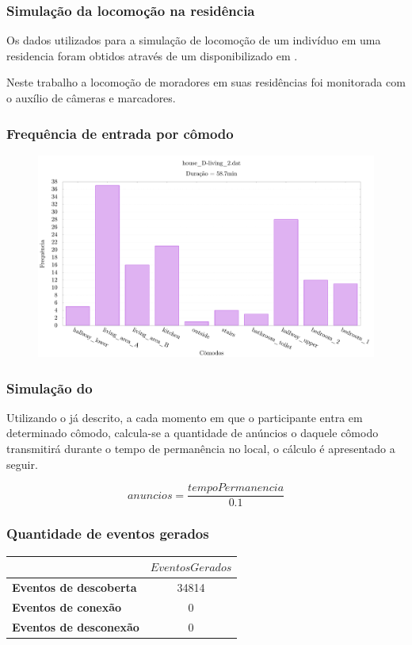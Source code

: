 \documentclass[aspectratio=169]{beamer}
\begin{document}
\begin{frame}
	\frametitle{Simulação da locomoção na residência}
	Os dados utilizados para a simulação de locomoção de um indivíduo em uma residencia foram obtidos através de um \dataset disponibilizado em \cite{byrne:et-al:2018}.

	\bigskip

	Neste trabalho a locomoção de moradores em suas residências foi monitorada com o auxílio de câmeras e marcadores.
\end{frame}

\begin{frame}
	\frametitle{Frequência de entrada por cômodo}
	\begin{figure}
		\centering
		\includegraphics[width=.80\linewidth]{img/dataset-histogram.pdf}
	\end{figure}
\end{frame}

\begin{frame}
	\frametitle{Simulação do \beacons}
	Utilizando o \dataset já descrito, a cada momento em que o participante entra em determinado cômodo, calcula-se a quantidade de anúncios o \beacon daquele cômodo transmitirá durante o tempo de permanência no local, o cálculo é apresentado a seguir.
	
	\begin{equation}
		anuncios = \frac{tempoPermanencia}{0.1} 
	\end{equation}
\end{frame}

\begin{frame}
	\frametitle{Quantidade de eventos gerados}
	\begin{table}
		\centering
		\begin{tabular}{lc}
			\toprule
						       & $EventosGerados$ \\
			\midrule 
			\textbf{Eventos de descoberta} & 34814            \\
			\textbf{Eventos de conexão}    & 0                \\
			\textbf{Eventos de desconexão} & 0                \\
			\bottomrule
		\end{tabular}
	\end{table}
\end{frame}
\end{document}
